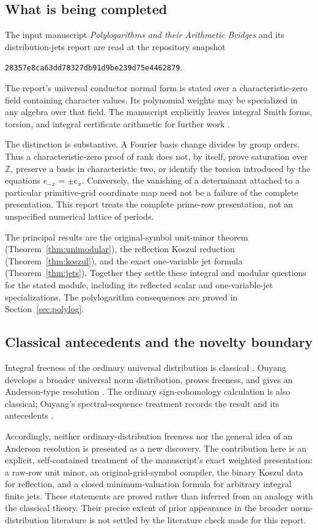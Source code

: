 \documentclass[11pt]{article}
\numberwithin{equation}{section}
\theoremstyle{definition}
\theoremstyle{remark}
\newcommand{\Z}{\mathbb Z}
\newcommand{\snap}{28357e8ca63dd78327db91d9be239d75e4462879}
\begin{document}
\subsection{What is being completed}
The input manuscript \emph{Polylogarithms and their Arithmetic Bridges}
and its distribution-jets report are read at the repository snapshot
\begin{center}
\small\texttt{\snap}.
\end{center}
The report's universal conductor normal form is stated over a
characteristic-zero field containing character values. Its polynomial
weights may be specialized in any algebra over that field. The manuscript
explicitly leaves integral Smith forms, torsion, and integral certificate
arithmetic for further work \cite{repo,repodistribution}.

The distinction is substantive. A Fourier basis change divides by group
orders. Thus a characteristic-zero proof of rank does not, by itself,
prove saturation over $\Z$, preserve a basis in characteristic two, or
identify the torsion introduced by the equations $e_{-x}=\pm e_x$.
Conversely, the vanishing of a determinant attached to a particular
primitive-grid coordinate map need not be a failure of the complete
presentation. This report treats the complete prime-row presentation,
not an unspecified numerical lattice of periods.

The principal results are the original-symbol unit-minor theorem
(Theorem~\ref{thm:unimodular}), the reflection Koszul reduction
(Theorem~\ref{thm:koszul}), and the exact one-variable jet formula
(Theorem~\ref{thm:jets}). Together they settle these integral and modular
questions for the stated module, including its reflected scalar and
one-variable-jet specializations. The polylogarithm consequences are
proved in Section~\ref{sec:polylog}.

\subsection{Classical antecedents and the novelty boundary}
Integral freeness of the ordinary universal distribution is classical
\cite{Kubert}. Ouyang develops a broader universal norm distribution,
proves freeness, and gives an Anderson-type resolution
\cite[Propositions 4.1--4.2 and Theorem 5.1]{OuyangNorm}.
The ordinary sign-cohomology calculation is also classical;
Ouyang's spectral-sequence treatment records the result and its
antecedents \cite[Theorem 7.1]{OuyangSign}.

Accordingly, neither ordinary-distribution freeness nor the general idea
of an Anderson resolution is presented as a new discovery. The
contribution here is an explicit, self-contained treatment of the
manuscript's exact weighted presentation: a raw-row unit minor, an
original-grid-symbol compiler, the binary Koszul data for reflection,
and a closed minimum-valuation formula for arbitrary integral finite
jets. These statements are proved rather than inferred from an analogy
with the classical theory. Their precise extent of prior appearance in
the broader norm-distribution literature is not settled by the literature
check made for this report.
\end{document}
